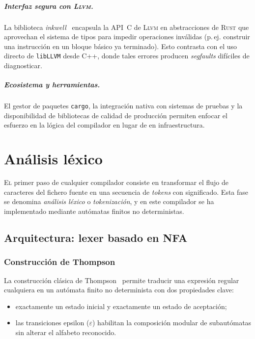 \documentclass[11pt,a4paper,oneside,openany]{report}
\newcommand{\code}[1]{\texttt{#1}}
\newcommand{\rust}{\textsc{Rust}}
\newcommand{\llvm}{\textsc{Llvm}}
\newcommand{\inkwell}{\textit{inkwell}}
\begin{document}
\paragraph{Interfaz segura con \llvm{}.}
La biblioteca \inkwell{}~\cite{inkwell} encapsula la API~C de \llvm{} en abstracciones
de \rust{} que aprovechan el sistema de tipos para impedir operaciones inválidas
(p.\,ej. construir una instrucción en un bloque básico ya terminado). Esto
contrasta con el uso directo de \code{libLLVM} desde C++, donde tales errores
producen \textit{segfaults} difíciles de diagnosticar.

\paragraph{Ecosistema y herramientas.}
El gestor de paquetes \code{cargo}, la integración nativa con sistemas de pruebas y
la disponibilidad de bibliotecas de calidad de producción permiten enfocar el
esfuerzo en la lógica del compilador en lugar de en infraestructura.

\chapter{Análisis léxico}
\label{cap:lex}

\lettrine[lines=2,findent=2pt,nindent=0pt]{E}{l} primer paso de cualquier compilador
consiste en transformar el flujo de caracteres del fichero fuente en una secuencia
de \textit{tokens} con significado. Esta fase se denomina \textit{análisis léxico} o
\textit{tokenización}, y en este compilador se ha implementado mediante autómatas
finitos no deterministas.

\section{Arquitectura: lexer basado en NFA}

\subsection{Construcción de Thompson}

La construcción clásica de Thompson~\cite{thompson1968} permite traducir una expresión
regular cualquiera en un autómata finito no determinista con dos propiedades clave:

\begin{itemize}
  \item exactamente un estado inicial y exactamente un estado de aceptación;
  \item las transiciones epsilon ($\varepsilon$) habilitan la composición modular de
    subautómatas sin alterar el alfabeto reconocido.
\end{itemize}
\end{document}
